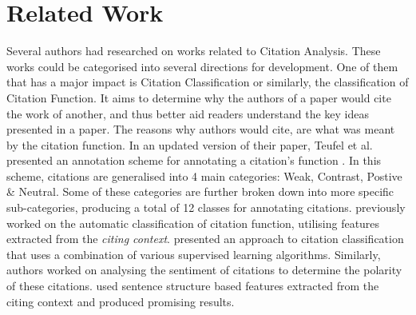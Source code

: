 \chapter{Related Work}
\label{Related Works}

Several authors had researched on works related to Citation Analysis. These works could be categorised into several directions for development. One of them that has a major impact is Citation Classification or similarly, the classification of Citation Function. It aims to determine why the authors of a paper would cite the work of another, and thus better aid readers understand the key ideas presented in a paper. The reasons why authors would cite, are what was meant by the citation function. In an updated version of their paper, Teufel et al. presented an annotation scheme for annotating a citation's function \cite{teufel2009annotation}. In this scheme, citations are generalised into 4 main categories: Weak, Contrast, Postive \& Neutral. Some of these categories are further broken down into more specific sub-categories, producing a total of 12 classes for annotating citations. \cite{teufel2006automatic} previously worked on the automatic classification of citation function, utilising features extracted from the \textit{citing context}. \cite{dongensemble} presented an approach to citation classification that uses a combination of various supervised learning algorithms. Similarly, authors worked on analysing the sentiment of citations to determine the polarity of these citations. \cite{athar2011sentiment} used sentence structure based features extracted from the citing context and produced promising results.


